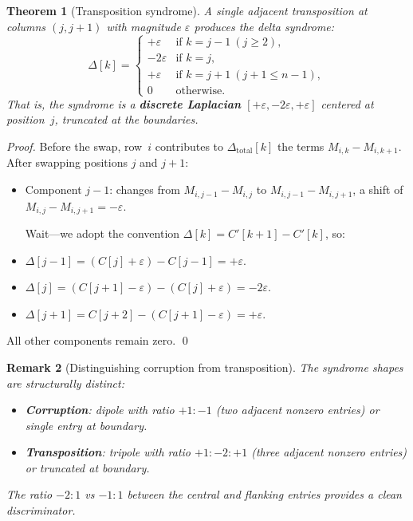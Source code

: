 \documentclass[11pt]{article}
\newtheorem{theorem}{Theorem}
\newtheorem{remark}[theorem]{Remark}
\begin{document}
\begin{theorem}[Transposition syndrome]\label{thm:syndromes}
A single adjacent transposition at columns $(j, j+1)$ with magnitude $\varepsilon$ produces the delta syndrome:
\[
\Delta[k] = \begin{cases}
+\varepsilon & \text{if } k = j-1\ (j \geq 2), \\
-2\varepsilon & \text{if } k = j, \\
+\varepsilon & \text{if } k = j+1\ (j+1 \leq n-1), \\
0 & \text{otherwise.}
\end{cases}
\]
That is, the syndrome is a \textbf{discrete Laplacian} $[+\varepsilon, -2\varepsilon, +\varepsilon]$ centered at position~$j$, truncated at the boundaries.
\end{theorem}

\begin{proof}
Before the swap, row~$i$ contributes to $\Delta_{\mathrm{total}}[k]$ the terms $M_{i,k} - M_{i,k+1}$. After swapping positions $j$ and $j+1$:
\begin{itemize}
\item Component $j-1$: changes from $M_{i,j-1} - M_{i,j}$ to $M_{i,j-1} - M_{i,j+1}$, a shift of $M_{i,j} - M_{i,j+1} = -\varepsilon$.

Wait---we adopt the convention $\Delta[k] = C'[k+1] - C'[k]$, so:
\item $\Delta[j-1] = (C[j] + \varepsilon) - C[j-1] = +\varepsilon$.
\item $\Delta[j] = (C[j+1] - \varepsilon) - (C[j] + \varepsilon) = -2\varepsilon$.
\item $\Delta[j+1] = C[j+2] - (C[j+1] - \varepsilon) = +\varepsilon$.
\end{itemize}
All other components remain zero. \qed
\end{proof}

\begin{remark}[Distinguishing corruption from transposition]
The syndrome shapes are structurally distinct:
\begin{itemize}
\item \textbf{Corruption}: dipole with ratio $+1:-1$ (two adjacent nonzero entries) or single entry at boundary.
\item \textbf{Transposition}: tripole with ratio $+1:-2:+1$ (three adjacent nonzero entries) or truncated at boundary.
\end{itemize}
The ratio $-2:1$ vs $-1:1$ between the central and flanking entries provides a clean discriminator.
\end{remark}
\end{document}

